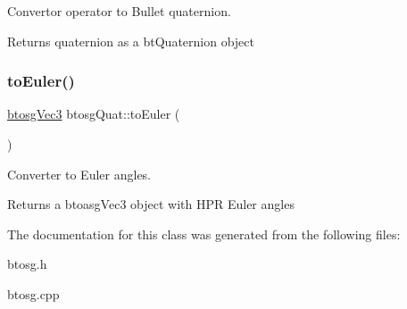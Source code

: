 Convertor operator to Bullet quaternion. 

Returns quaternion as a bt\+Quaternion object \mbox{\label{classbtosgQuat_aeda394d825b449ab87a77820aad1737d}} 
\subsubsection{\texorpdfstring{to\+Euler()}{toEuler()}}
{\footnotesize\ttfamily \hyperlink{classbtosgVec3}{btosg\+Vec3} btosg\+Quat\+::to\+Euler (\begin{DoxyParamCaption}{ }\end{DoxyParamCaption})}



Converter to Euler angles. 

Returns a btoasg\+Vec3 object with H\+PR Euler angles 

The documentation for this class was generated from the following files\+:\begin{DoxyCompactItemize}
\item 
btosg.\+h\item 
btosg.\+cpp\end{DoxyCompactItemize}
